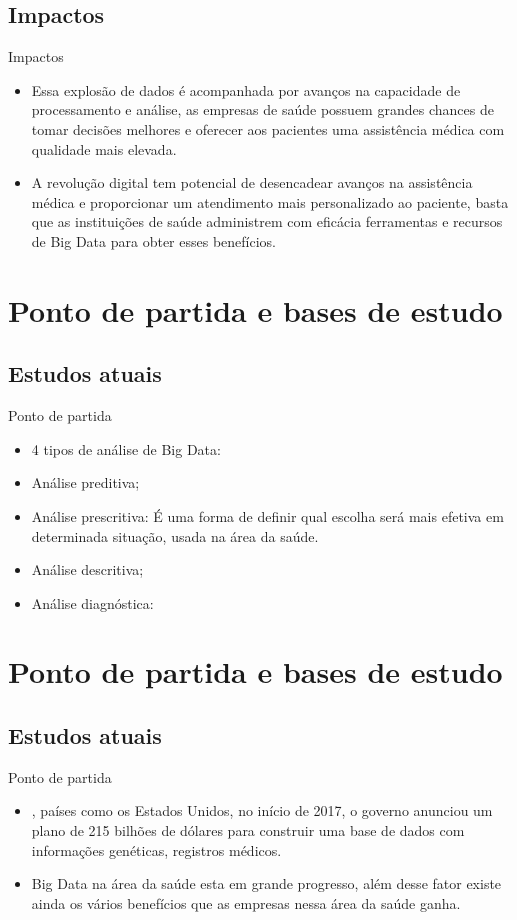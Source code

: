 \documentclass{beamer}
\begin{document}
\subsection{Impactos}
\begin{frame}{Impactos}
    \begin{itemize}
         \item{Essa explosão de dados é acompanhada por avanços na capacidade de processamento e análise, as empresas de saúde possuem grandes chances de tomar decisões melhores e oferecer aos pacientes uma assistência médica com qualidade mais elevada.
         }
         \item{A revolução digital tem potencial de desencadear avanços na assistência médica e proporcionar um atendimento mais personalizado ao paciente, basta que as instituições de saúde administrem com eficácia ferramentas e recursos de Big Data para obter esses benefícios.
         }
  \end{itemize}
\end{frame}

\section{Ponto de partida e bases de estudo}
\subsection{Estudos atuais}
\begin{frame}{Ponto de partida}
\begin{itemize}
\item 4 tipos de análise de Big Data:
    \item{Análise preditiva;}
    \item Análise prescritiva: É uma forma de definir qual escolha será mais efetiva em determinada situação, usada na área da saúde.
    \item Análise descritiva;
    \item Análise diagnóstica:
\end{itemize}
\end{frame}

\section{Ponto de partida e bases de estudo}
\subsection{Estudos atuais}
\begin{frame}{Ponto de partida}
\begin{itemize}
    \item {\cite{Oracle}, países como os Estados Unidos, no início de 2017, o governo anunciou um plano de  215 bilhões de dólares para construir uma base de dados com informações genéticas, registros médicos.}
    \item {Big Data na área da saúde esta em grande progresso, além desse fator existe ainda os vários benefícios que as empresas nessa área da saúde ganha. }

\end{itemize}
\end{frame}
\end{document}
